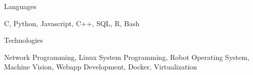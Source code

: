 

\begin{cventries}

  \cventry
    {Languages} %
    { }
    { } %
    { } %
    {
      \begin{cvitems} %
        \item {C, Python, Javascript, C++, SQL, R, Bash}
      \end{cvitems}
    }

  \cventry
    { Technologies } %
    {} %
    {} %
    {} %
    {
      \begin{cvitems} %
        \item { Network Programming, Linux System Programming, Robot Operating System, Machine Vision, Webapp Development, Docker, Virtualization}
      \end{cvitems}
    }

\end{cventries}
